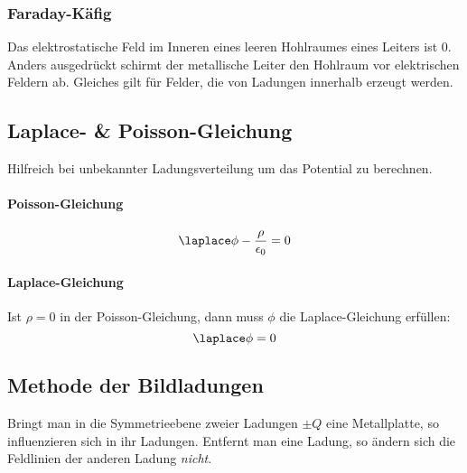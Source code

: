 		\subsubsection{Faraday-Käfig} %
			Das elektrostatische Feld im Inneren eines leeren Hohlraumes eines Leiters ist $0$.
			Anders ausgedrückt schirmt der metallische Leiter den Hohlraum vor elektrischen Feldern ab.
			Gleiches gilt für Felder, die von Ladungen innerhalb erzeugt werden.
	\subsection{Laplace- \& Poisson-Gleichung} %
		Hilfreich bei unbekannter Ladungsverteilung um das Potential zu berechnen.
		\paragraph{Poisson-Gleichung} %
			\begin{equation*}
				\laplace\phi - \frac{\rho}{\epsilon_0} = 0
			\end{equation*}
		\paragraph{Laplace-Gleichung} %
			Ist $\rho = 0$ in der Poisson-Gleichung, dann muss $\phi$ die Laplace-Gleichung erfüllen:
			\begin{equation*}
				\laplace\phi = 0
			\end{equation*}
	\subsection{Methode der Bildladungen} %
		\begin{wrapfigure}[10]{r}{.5\columnwidth}
			\vspace{-1.75cm}
			\begin{center}
					
			\end{center}
		\end{wrapfigure}
		
		Bringt man in die Symmetrieebene zweier Ladungen $\pm Q$ eine Metallplatte, so
		influenzieren sich in ihr Ladungen. Entfernt man eine Ladung, so ändern sich die
		Feldlinien der anderen Ladung \emph{nicht}.
		

